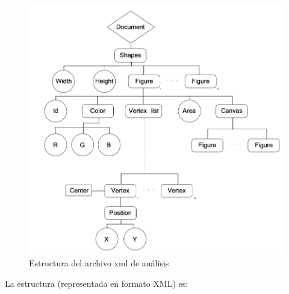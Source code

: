 			\begin{figure}[htbp]
			\centering
			\includegraphics[scale=0.47]{graphics/xml-representation.png}
			\caption{Estructura del archivo xml de análisis}
			\label{fig:estructuraFiguras}
			\end{figure}
		
	La estructura (representada en formato XML) es:\\
	
	
